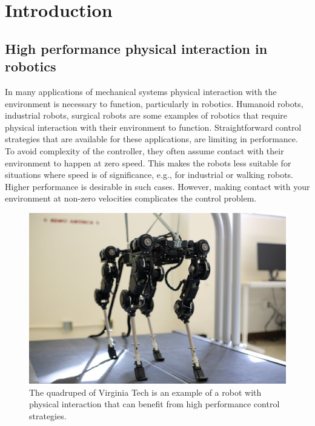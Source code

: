 \documentclass[../DC2017114Bouma.tex]{subfiles}
\begin{document}
\graphicspath{{01_Introduction/img/}}
\renewcommand{\chaptermark}[1]{\markboth{\thechapter.\ #1}{}}
\renewcommand{\sectionmark}[1]{\markright{#1}{}}
\cleartooddpage
\pagestyle{fancyreport}

\chapter{Introduction}
\section{High performance physical interaction in robotics}
In many applications of mechanical systems physical interaction with the environment is necessary to function, particularly in robotics. Humanoid robots, industrial robots, surgical robots are some examples of robotics that require physical interaction with their environment to function. Straightforward control strategies that are available for these applications, are limiting in performance. To avoid complexity of the controller, they often assume contact with their environment to happen at zero speed. This makes the robots less suitable for situations where speed is of significance, e.g., for industrial or walking robots. Higher performance is desirable in such cases. However, making contact with your environment at non-zero velocities complicates the control problem.

\begin{figure}[H]
\centering
\includegraphics[width=.5\textwidth]{quadruped.jpg}\caption{The quadruped of Virginia Tech is an example of a robot with physical interaction that can benefit from high performance control strategies.}\label{fig:quadrupedVT}
\end{figure}
\end{document}
